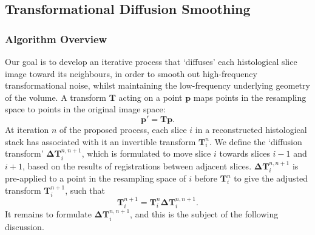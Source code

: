   \subsection{Transformational Diffusion Smoothing} %
  \label{sub:transformational_diffusion_smoothing}
    \subsubsection{Algorithm Overview} %
    \label{ssub:algorithm_overview}
    Our goal is to develop an iterative process that `diffuses' each histological slice image toward its neighbours, in order to smooth out high-frequency transformational noise, whilst maintaining the low-frequency underlying geometry of the volume. A transform $\mathbf{T}$ acting on a point $\mathbf{p}$ maps points in the resampling space to points in the original image space:
  		\begin{equation}
  			\mathbf{p'} = \mathbf{Tp}.
  		\end{equation}
    At iteration $n$ of the proposed process, each slice $i$ in a reconstructed histological stack has associated with it an invertible transform $\mathbf{T}_i^n$. We define the `diffusion transform' $\mathbf{\Delta T}_i^{n,n+1}$, which is formulated to move slice $i$ towards slices $i-1$ and $i+1$, based on the results of registrations between adjacent slices. $\mathbf{\Delta T}_i^{n,n+1}$ is pre-applied to a point in the resampling space of $i$ before $\mathbf{T}_i^n$ to give the adjusted transform $\mathbf{T}_i^{n+1}$, such that
    	\begin{equation}
  			\mathbf{T}_i^{n+1} = \mathbf{T}_i^n \mathbf{\Delta T}_i^{n,n+1}. \label{eqn:adjusted_transforms}
  		\end{equation}
	  It remains to formulate $\mathbf{\Delta T}_i^{n,n+1}$, and this is the subject of the following discussion.
    
